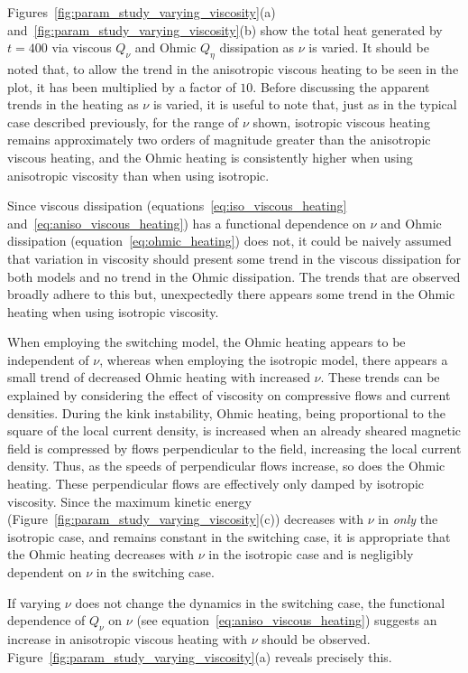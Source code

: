 Figures~\ref{fig:param_study_varying_viscosity}(a) and~\ref{fig:param_study_varying_viscosity}(b) show the total heat generated by $t=400$ via viscous $Q_{\nu}$ and Ohmic $Q_{\eta}$ dissipation as $\nu$ is varied. It should be noted that, to allow the trend in the anisotropic viscous heating to be seen in the plot, it has been multiplied by a factor of $10$. Before discussing the apparent trends in the heating as $\nu$ is varied, it is useful to note that, just as in the typical case described previously, for the range of $\nu$ shown, isotropic viscous heating remains approximately two orders of magnitude greater than the anisotropic viscous heating, and the Ohmic heating is consistently higher when using anisotropic viscosity than when using isotropic.

Since viscous dissipation (equations~\eqref{eq:iso_viscous_heating} and~\eqref{eq:aniso_viscous_heating}) has a functional dependence on $\nu$ and Ohmic dissipation (equation~\eqref{eq:ohmic_heating}) does not, it could be naively assumed that variation in viscosity should present some trend in the viscous dissipation for both models and no trend in the Ohmic dissipation. The trends that are observed broadly adhere to this but, unexpectedly there appears some trend in the Ohmic heating when using isotropic viscosity.

When employing the switching model, the Ohmic heating appears to be independent of $\nu$, whereas when employing the isotropic model, there appears a small trend of decreased Ohmic heating with increased $\nu$. These trends can be explained by considering the effect of viscosity on compressive flows and current densities. During the kink instability, Ohmic heating, being proportional to the square of the local current density, is increased when an already sheared magnetic field is compressed by flows perpendicular to the field, increasing the local current density. Thus, as the speeds of perpendicular flows increase, so does the Ohmic heating. These perpendicular flows are effectively only damped by isotropic viscosity. Since the maximum kinetic energy (Figure~\ref{fig:param_study_varying_viscosity}(c)) decreases with $\nu$ in \emph{only} the isotropic case, and remains constant in the switching case, it is appropriate that the Ohmic heating decreases with $\nu$ in the isotropic case and is negligibly dependent on $\nu$ in the switching case.

If varying $\nu$ does not change the dynamics in the switching case, the functional dependence of $Q_{\nu}$ on $\nu$ (see equation~\eqref{eq:aniso_viscous_heating}) suggests an increase in anisotropic viscous heating with $\nu$ should be observed. Figure~\ref{fig:param_study_varying_viscosity}(a) reveals precisely this.

